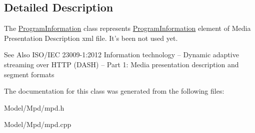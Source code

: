 \subsection{Detailed Description}
The \hyperlink{class_program_information}{Program\-Information} class represents \hyperlink{class_program_information}{Program\-Information} element of Media Presentation Description xml file. It's been not used yet. 

\begin{DoxySeeAlso}{See Also}
I\-S\-O/\-I\-E\-C 23009-\/1\-:2012 Information technology – Dynamic adaptive streaming over H\-T\-T\-P (D\-A\-S\-H) – Part 1\-: Media presentation description and segment formats 
\end{DoxySeeAlso}


The documentation for this class was generated from the following files\-:\begin{DoxyCompactItemize}
\item 
Model/\-Mpd/mpd.\-h\item 
Model/\-Mpd/mpd.\-cpp\end{DoxyCompactItemize}
